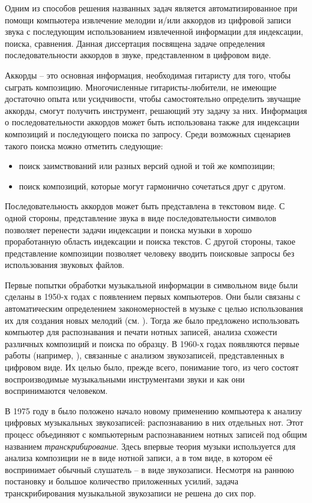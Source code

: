 Одним из способов решения названных задач является автоматизированное при помощи
компьютера извлечение мелодии и/или аккордов из цифровой записи звука с
последующим использованием извлеченной информации для индексации, поиска,
сравнения. Данная диссертация посвящена задаче определения последовательности
аккордов в звуке, представленном в цифровом виде.

Аккорды -- это основная информация, необходимая гитаристу для того, чтобы
сыграть композицию. Многочисленные гитаристы-любители, не имеющие достаточно
опыта или усидчивости, чтобы самостоятельно определить звучащие аккорды, смогут
получить инструмент, решающий эту задачу за них. Информация о последовательности
аккордов может быть использована также для индексации композиций и последующего
поиска по запросу. Среди возможных сценариев такого поиска можно отметить
следующие:
\begin{itemize}
  \item поиск заимствований или разных версий одной и той же композиции;
  \item поиск композиций, которые могут гармонично сочетаться друг с другом.
\end{itemize}

Последовательность аккордов может быть представлена в текстовом виде. С одной
стороны, представление звука в виде последовательности символов позволяет
перенести задачи индексации и поиска музыки в хорошо проработанную область
индексации и поиска текстов. С другой стороны, такое представление композиции
позволяет человеку вводить поисковые запросы без использования звуковых файлов.

\medskip

Первые попытки обработки музыкальной информации в символьном виде были сделаны в
1950-х годах с появлением первых компьютеров. Они были связаны с автоматическим
определением закономерностей в музыке с целью использования их для создания
новых мелодий (см. \cite{Schueler2005}). Тогда же было предложено использовать
компьютер для распознавания и печати нотных записей, анализа схожести различных
композиций и поиска по образцу. В 1960-х годах появляются первые работы
(например, \cite{Freedman1967}), связанные с анализом звукозаписей,
представленных в цифровом виде. Их целью было, прежде всего, понимание того, из
чего состоят воспроизводимые музыкальными инструментами звуки и как они
воспринимаются человеком.

В 1975 году в \cite{Moorer1975} было положено начало новому применению
компьютера к анализу цифровых музыкальных звукозаписей: распознаванию в них
отдельных нот. Этот процесс объединяют с компьютерным распознаванием нотных
записей под общим названием \emph{транскрибирование}. Здесь впервые теория
музыки используется для анализа композиции не в виде нотной записи, а в том
виде, в котором её воспринимает обычный слушатель -- в виде звукозаписи.
Несмотря на раннюю постановку и большое количество приложенных усилий, задача
транскрибирования музыкальной звукозаписи не решена до сих пор.

